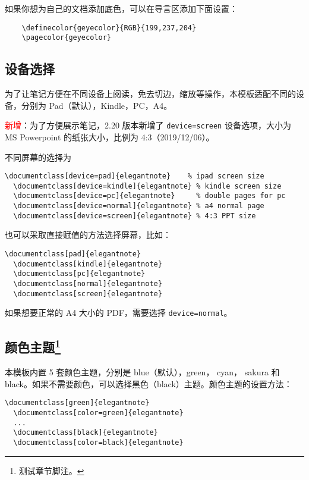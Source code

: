 \documentclass[cn,hazy,blue,screen,14pt]{elegantnote}
\begin{document}
\begin{remark}
  如果你想为自己的文档添加底色，可以在导言区添加下面设置：
  \begin{lstlisting}
    \definecolor{geyecolor}{RGB}{199,237,204}
    \pagecolor{geyecolor}
  \end{lstlisting}
\end{remark}


\subsection{设备选择}

为了让笔记方便在不同设备上阅读，免去切边，缩放等操作，本模板适配不同的设备，分别为 Pad（默认），Kindle，PC，A4。

\textcolor{red}{\kaishu 新增}：为了方便展示笔记，2.20 版本新增了 \lstinline{device=screen} 设备选项，大小为 MS Powerpoint 的纸张大小，比例为 4:3（2019/12/06）。

不同屏幕的选择为
\begin{lstlisting}[frame=none]  
  \documentclass[device=pad]{elegantnote}    % ipad screen size
  \documentclass[device=kindle]{elegantnote} % kindle screen size
  \documentclass[device=pc]{elegantnote}     % double pages for pc 
  \documentclass[device=normal]{elegantnote} % a4 normal page
  \documentclass[device=screen]{elegantnote} % 4:3 PPT size
\end{lstlisting}
\begin{note}
也可以采取直接赋值的方法选择屏幕，比如：
\end{note}
\begin{lstlisting}[frame=none]  
  \documentclass[pad]{elegantnote}
  \documentclass[kindle]{elegantnote}
  \documentclass[pc]{elegantnote}
  \documentclass[normal]{elegantnote}
  \documentclass[screen]{elegantnote}
\end{lstlisting}

\begin{note}
  如果想要正常的 A4 大小的 PDF，需要选择 \lstinline{device=normal}。
\end{note}


\subsection[颜色主题]{颜色主题\footnote{测试章节脚注。}}

本模板内置 5 套颜色主题，分别是 \textcolor{eblue}{blue}（默认），\textcolor{egreen}{green}， \textcolor{ecyan}{cyan}， \textcolor{sakura}{sakura} 和 \textcolor{black}{black}。如果不需要颜色，可以选择黑色（black）主题。颜色主题的设置方法：
\begin{lstlisting}[frame=none]  
  \documentclass[green]{elegantnote}
  \documentclass[color=green]{elegantnote}
  ...
  \documentclass[black]{elegantnote}
  \documentclass[color=black]{elegantnote}
\end{lstlisting}
\end{document}

